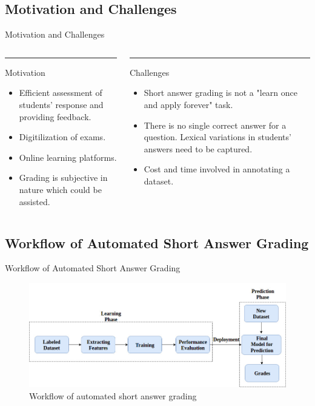 \documentclass{beamer}
\begin{document}
\subsection{Motivation and Challenges}
\begin{frame}{Motivation and Challenges}


\begin{columns}[T] %
	\begin{column}{.48\textwidth}
		\color{blue}\rule{\linewidth}{4pt}
		Motivation
			\begin{itemize}
			\item Efficient assessment of students' response and providing feedback.
			\item Digitilization of exams.
			\item Online learning platforms.
			\item Grading is subjective in nature which could be assisted.
		\end{itemize}
	\end{column}%
	\hfill%
	\begin{column}{.48\textwidth}
		\color{blue}\rule{\linewidth}{4pt}
		
		Challenges
		\begin{itemize}
			\item Short answer grading is not a "learn once and apply forever" task.
			\item There is no single correct answer for a question. Lexical variations in students' answers need to be captured.
			\item Cost and time involved in annotating a dataset.
		\end{itemize}
	\end{column}%
\end{columns}



\end{frame}


\subsection{Workflow of Automated Short Answer Grading}
\begin{frame}{Workflow of Automated Short Answer Grading}
	
	\begin{figure}[!htb]
		\centering
		\includegraphics[scale=0.36]{images/auto_workflow}
		\caption{Workflow of automated short answer grading \cite{Burrows2015}}
		\label{auto_workflow}
	\end{figure}
\end{frame}
\end{document}
